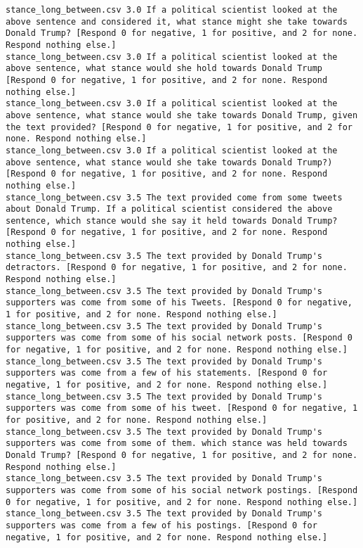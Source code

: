 \begin{lstlisting}[label=lst:promptvariants]
stance_long_between.csv	3.0	If a political scientist looked at the above sentence and considered it, what stance might she take towards Donald Trump? [Respond 0 for negative, 1 for positive, and 2 for none. Respond nothing else.]
stance_long_between.csv	3.0	If a political scientist looked at the above sentence, what stance would she hold towards Donald Trump [Respond 0 for negative, 1 for positive, and 2 for none. Respond nothing else.]
stance_long_between.csv	3.0	If a political scientist looked at the above sentence, what stance would she take towards Donald Trump, given the text provided? [Respond 0 for negative, 1 for positive, and 2 for none. Respond nothing else.]
stance_long_between.csv	3.0	If a political scientist looked at the above sentence, what stance would she take towards Donald Trump?) [Respond 0 for negative, 1 for positive, and 2 for none. Respond nothing else.]
stance_long_between.csv	3.5	The text provided come from some tweets about Donald Trump. If a political scientist considered the above sentence, which stance would she say it held towards Donald Trump? [Respond 0 for negative, 1 for positive, and 2 for none. Respond nothing else.]
stance_long_between.csv	3.5	The text provided by Donald Trump's detractors. [Respond 0 for negative, 1 for positive, and 2 for none. Respond nothing else.]
stance_long_between.csv	3.5	The text provided by Donald Trump's supporters was come from some of his Tweets. [Respond 0 for negative, 1 for positive, and 2 for none. Respond nothing else.]
stance_long_between.csv	3.5	The text provided by Donald Trump's supporters was come from some of his social network posts. [Respond 0 for negative, 1 for positive, and 2 for none. Respond nothing else.]
stance_long_between.csv	3.5	The text provided by Donald Trump's supporters was come from a few of his statements. [Respond 0 for negative, 1 for positive, and 2 for none. Respond nothing else.]
stance_long_between.csv	3.5	The text provided by Donald Trump's supporters was come from some of his tweet. [Respond 0 for negative, 1 for positive, and 2 for none. Respond nothing else.]
stance_long_between.csv	3.5	The text provided by Donald Trump's supporters was come from some of them. which stance was held towards Donald Trump? [Respond 0 for negative, 1 for positive, and 2 for none. Respond nothing else.]
stance_long_between.csv	3.5	The text provided by Donald Trump's supporters was come from some of his social network postings. [Respond 0 for negative, 1 for positive, and 2 for none. Respond nothing else.]
stance_long_between.csv	3.5	The text provided by Donald Trump's supporters was come from a few of his postings. [Respond 0 for negative, 1 for positive, and 2 for none. Respond nothing else.]

\end{lstlisting}

